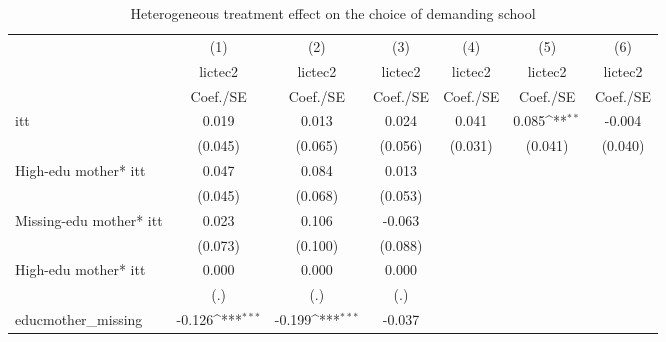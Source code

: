 \begin{table}[htbp]\centering
\def\sym#1{\ifmmode^{#1}\else\(^{#1}\)\fi}
\caption{Heterogeneous treatment effect on the choice of demanding school \label{Hetereogeneouseffects}}
\begin{tabular}{l*{6}{c}}
\toprule
                    &\multicolumn{1}{c}{(1)}&\multicolumn{1}{c}{(2)}&\multicolumn{1}{c}{(3)}&\multicolumn{1}{c}{(4)}&\multicolumn{1}{c}{(5)}&\multicolumn{1}{c}{(6)}\\
                    &\multicolumn{1}{c}{lictec2}&\multicolumn{1}{c}{lictec2}&\multicolumn{1}{c}{lictec2}&\multicolumn{1}{c}{lictec2}&\multicolumn{1}{c}{lictec2}&\multicolumn{1}{c}{lictec2}\\
                    &    Coef./SE         &    Coef./SE         &    Coef./SE         &    Coef./SE         &    Coef./SE         &    Coef./SE         \\
\midrule
itt                 &       0.019         &       0.013         &       0.024         &       0.041         &       0.085\sym{**} &      -0.004         \\
                    &     (0.045)         &     (0.065)         &     (0.056)         &     (0.031)         &     (0.041)         &     (0.040)         \\
High-edu mother* itt&       0.047         &       0.084         &       0.013         &                     &                     &                     \\
                    &     (0.045)         &     (0.068)         &     (0.053)         &                     &                     &                     \\
Missing-edu mother* itt&       0.023         &       0.106         &      -0.063         &                     &                     &                     \\
                    &     (0.073)         &     (0.100)         &     (0.088)         &                     &                     &                     \\
High-edu mother* itt&       0.000         &       0.000         &       0.000         &                     &                     &                     \\
                    &         (.)         &         (.)         &         (.)         &                     &                     &                     \\
educmother\_missing  &      -0.126\sym{***}&      -0.199\sym{***}&      -0.037         &                     &                     &                     \\

\end{tabular}
\end{table}
